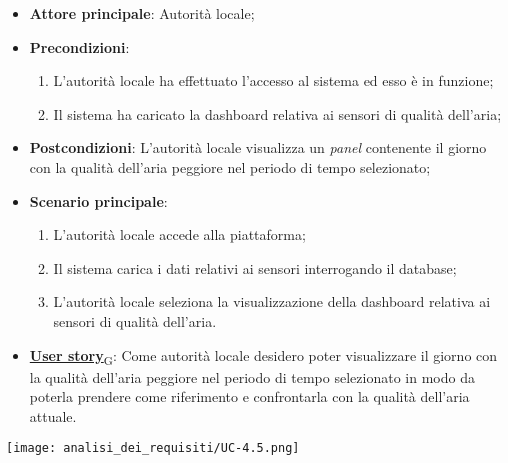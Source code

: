 \begin{itemize}
	\item \textbf{Attore principale}: Autorità locale;
	\item \textbf{Precondizioni}:
	      \begin{enumerate}
		      \item L'autorità locale ha effettuato l'accesso al sistema ed esso è in funzione;
		      \item Il sistema ha caricato la dashboard relativa ai sensori di qualità dell'aria;
	      \end{enumerate}
	\item \textbf{Postcondizioni}: L'autorità locale visualizza un \textit{panel} contenente il giorno con la qualità dell'aria peggiore nel periodo di tempo selezionato;
	\item \textbf{Scenario principale}:
	      \begin{enumerate}
		      \item L'autorità locale accede alla piattaforma;
		      \item Il sistema carica i dati relativi ai sensori interrogando il database;
		      \item L'autorità locale seleziona la visualizzazione della dashboard relativa ai sensori di qualità dell'aria.
	      \end{enumerate}
	\item \href{https://7last.github.io/docs/rtb/documentazione-interna/glossario\#user-story}{\textbf{User story}\textsubscript{G}}:
	      Come autorità locale desidero poter visualizzare il giorno con la qualità dell'aria peggiore nel periodo di tempo selezionato
	      in modo da poterla prendere come riferimento e confrontarla con la qualità dell'aria attuale.
\end{itemize}
\begin{center}
	\texttt{[image: analisi\_dei\_requisiti/UC-4.5.png]}
\end{center}

